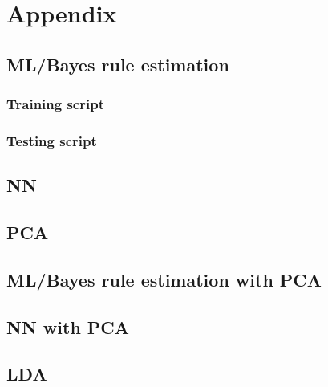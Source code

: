 \documentclass[12pt]{article}
\begin{document}
\newpage
\section*{Appendix}
\subsection*{ML/Bayes rule estimation}
\subsubsection*{Training script}


\subsubsection*{Testing script}


\subsection*{NN}


\subsection*{PCA}
\subsection{ML/Bayes rule estimation with PCA}


\subsection{NN with PCA}


\subsection*{LDA}

\end{document}

